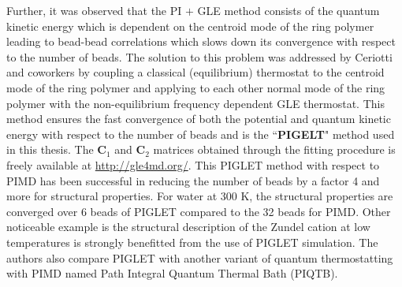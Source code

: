 

\noindent Further, it was observed that the PI $+$ GLE method consists of the quantum kinetic energy which is dependent on the centroid mode of the ring polymer leading to bead-bead correlations which slows down its convergence with respect to the number of beads. The solution to this problem was addressed by Ceriotti and coworkers\cite{ceriotti2012efficient} by coupling a classical (equilibrium) thermostat to the centroid mode of the ring polymer and applying to each other normal mode of the ring polymer with the non-equilibrium frequency dependent GLE thermostat. This method ensures the fast convergence of both the potential and quantum kinetic energy with respect to the number of beads and is the ``\textbf{PIGELT}" method used in this thesis. The $\textbf{C}_1$ and $\textbf{C}_2$ matrices obtained through the fitting procedure is freely available at \underline{http://gle4md.org/}. This PIGLET method with respect to PIMD has been successful in reducing the number of beads by a factor 4 and more\cite{ceriotti2010efficient} for structural properties. For water at 300 K, the structural properties are converged over 6 beads of PIGLET compared to the 32 beads for PIMD\cite{ceriotti2012efficient}. Other noticeable example is the structural description of the Zundel cation at low temperatures is strongly benefitted from the use of PIGLET simulation\cite{schran2018converged}. The authors also compare PIGLET with another variant of quantum thermostatting with PIMD named Path Integral Quantum Thermal Bath (PIQTB\cite{schran2018converged,brieuc2016quantum}). 



